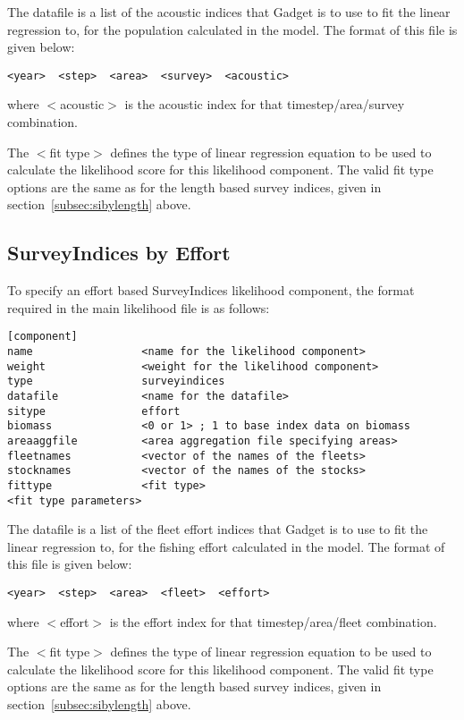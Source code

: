\documentclass[10pt,twoside]{book}
\begin{document}
The datafile is a list of the acoustic indices that Gadget is to use to fit the linear regression to, for the population calculated in the model.  The format of this file is given below:

{\small\begin{verbatim}
<year>  <step>  <area>  <survey>  <acoustic>
\end{verbatim}}

where $<$acoustic$>$ is the acoustic index for that timestep/area/survey combination.

\bigskip
The $<$fit type$>$ defines the type of linear regression equation to be used to calculate the likelihood score for this likelihood component.  The valid fit type options are the same as for the length based survey indices, given in section~\ref{subsec:sibylength} above.

\subsection{SurveyIndices by Effort}\label{subsec:sibyeffort}
To specify an effort based SurveyIndices likelihood component, the format required in the main likelihood file is as follows:

{\small\begin{verbatim}
[component]
name                 <name for the likelihood component>
weight               <weight for the likelihood component>
type                 surveyindices
datafile             <name for the datafile>
sitype               effort
biomass              <0 or 1> ; 1 to base index data on biomass
areaaggfile          <area aggregation file specifying areas>
fleetnames           <vector of the names of the fleets>
stocknames           <vector of the names of the stocks>
fittype              <fit type>
<fit type parameters>
\end{verbatim}}

The datafile is a list of the fleet effort indices that Gadget is to use to fit the linear regression to, for the fishing effort calculated in the model.  The format of this file is given below:

{\small\begin{verbatim}
<year>  <step>  <area>  <fleet>  <effort>
\end{verbatim}}

where $<$effort$>$ is the effort index for that timestep/area/fleet combination.

\bigskip
The $<$fit type$>$ defines the type of linear regression equation to be used to calculate the likelihood score for this likelihood component.  The valid fit type options are the same as for the length based survey indices, given in section~\ref{subsec:sibylength} above.
\end{document}
